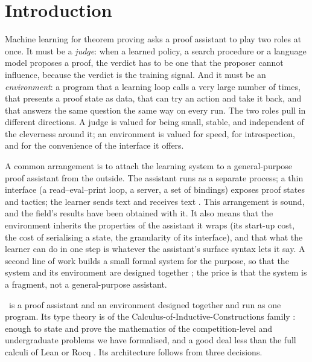 \section{Introduction}\label{sec:intro}

Machine learning for theorem proving asks a proof assistant to play two roles at once.
It must be a \emph{judge}: when a learned policy, a search procedure or a language model proposes a proof, the verdict has to be one that the proposer cannot influence, because the verdict is the training signal.
And it must be an \emph{environment}: a program that a learning loop calls a very large number of times, that presents a proof state as data, that can try an action and take it back, and that answers the same question the same way on every run.
The two roles pull in different directions.
A judge is valued for being small, stable, and independent of the cleverness around it; an environment is valued for speed, for introspection, and for the convenience of the interface it offers.

A common arrangement is to attach the learning system to a general-purpose proof assistant from the outside.
The assistant runs as a separate process; a thin interface (a read--eval--print loop, a server, a set of bindings) exposes proof states and tactics; the learner sends text and receives text \citep{yang19,huang19,bansal19,leangym,yang23,aniva24,dossantos25}.
This arrangement is sound, and the field's results have been obtained with it.
It also means that the environment inherits the properties of the assistant it wraps (its start-up cost, the cost of serialising a state, the granularity of its interface), and that what the learner can do in one step is whatever the assistant's surface syntax lets it say.
A second line of work builds a small formal system for the purpose, so that the system and its environment are designed together \citep{wu21,poesia23,poesia24}; the price is that the system is a fragment, not a general-purpose assistant.

\ITP\ is a proof assistant and an environment designed together and run as one program.
Its type theory is of the Calculus-of-Inductive-Constructions family \citep{coquand88cc,coquand90ind,paulin93}: enough to state and prove the mathematics of the competition-level and undergraduate problems we have formalised, and a good deal less than the full calculi of Lean or Rocq \citep{carneiro19,demoura21,rocq}.
Its architecture follows from three decisions.

